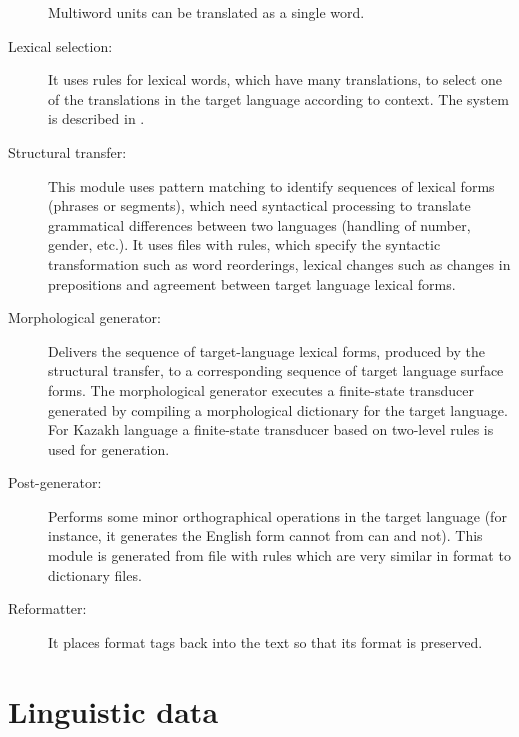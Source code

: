 \documentclass[11pt]{article}
\begin{document}
\begin{description}
 Multiword units can be translated as a single word.
\item[ Lexical selection:] It uses rules for lexical words, which have many translations, to select one of the translations 
  in the target language according to context. The system is described in \cite{tyers12a}.
\item [Structural transfer:] This module uses pattern matching to identify sequences of lexical forms  (phrases or 
  segments), which need syntactical processing to translate grammatical differences between two languages (handling of 
  number, gender, etc.). It uses  files with rules, which specify  the syntactic transformation such as word reorderings, 
  lexical changes such as changes in prepositions and agreement between target language lexical forms. %
\item[Morphological generator:] Delivers the sequence of target-language lexical forms, produced by the structural transfer, 
  to a corresponding sequence of target language surface forms. The morphological generator executes a finite-state transducer 
  generated by compiling a morphological dictionary for the target language.     
  For Kazakh language a finite-state transducer based on two-level rules \citep{washingtonsalimzyantyers14} is used for generation. 
\item[ Post-generator:] Performs some minor orthographical operations in the target language (for instance, it generates the 
  English form cannot from can and not). This module is generated from file with rules which are very   similar in format to dictionary files. 
\item[ Reformatter:] It places format tags back into the text so that its format is preserved.
\end{description}

\section{Linguistic data}
\end{document}
